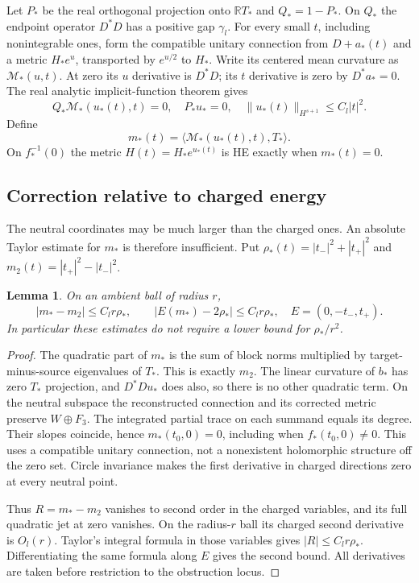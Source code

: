 \documentclass[11pt]{amsart}
\newtheorem{lemma}[theorem]{Lemma}
\theoremstyle{definition}
\theoremstyle{remark}
\newcommand{\RR}{\mathbb R}
\begin{document}
Let $P_*$ be the real orthogonal projection onto $\RR T_*$ and
$Q_*=1-P_*$. On $Q_*$ the endpoint operator $D^*D$ has a positive
gap $\gamma_l$. For every small $t$, including nonintegrable ones,
form the compatible unitary connection from $D+a_*(t)$ and a metric
$H_*e^u$, transported by $e^{u/2}$ to $H_*$. Write its centered mean
curvature as $\mathcal M_*(u,t)$. At zero its $u$ derivative is
$D^*D$; its $t$ derivative is zero by $D^*a_*=0$. The real analytic
implicit-function theorem gives
\begin{equation}\label{eq:endpoint-complement}
 Q_*\mathcal M_*(u_*(t),t)=0,\quad P_*u_*=0,\quad
 \|u_*(t)\|_{H^{s+1}}\le C_l|t|^2.
\end{equation}
Define
\[
 m_*(t)=\langle\mathcal M_*(u_*(t),t),T_*\rangle.
\]
On $f_*^{-1}(0)$ the metric $H(t)=H_*e^{u_*(t)}$ is HE exactly
when $m_*(t)=0$.

\subsection{Correction relative to charged energy}
The neutral coordinates may be much larger than the charged ones.
An absolute Taylor estimate for $m_*$ is therefore insufficient.
Put $\rho_*(t)=|t_-|^2+|t_+|^2$ and
$m_2(t)=|t_+|^2-|t_-|^2$.

\begin{lemma}\label{lem:charged-remainder}
On an ambient ball of radius $r$,
\begin{equation}\label{eq:charged-remainder}
 |m_*-m_2|\le C_l r\rho_*,\qquad
 |E(m_*)-2\rho_*|\le C_l r\rho_*,\quad
 E=(0,-t_-,t_+).
\end{equation}
In particular these estimates do not require a lower bound for
$\rho_*/r^2$.
\end{lemma}
\begin{proof}
The quadratic part of $m_*$ is the sum of block norms multiplied by
target-minus-source eigenvalues of $T_*$. This is exactly $m_2$.
The linear curvature of $b_*$ has zero $T_*$ projection, and
$D^*Du_*$ does also, so there is no other quadratic term.
On the neutral subspace the reconstructed connection and its corrected
metric preserve $W\oplus F_3$. The integrated partial trace on each
summand equals its degree. Their slopes coincide, hence $m_*(t_0,0)=0$,
including when $f_*(t_0,0)\ne0$. This uses a compatible unitary
connection, not a nonexistent holomorphic structure off the zero set.
Circle invariance makes the first derivative in charged directions
zero at every neutral point.

Thus $R=m_*-m_2$ vanishes to second order in the charged variables,
and its full quadratic jet at zero vanishes. On the radius-$r$ ball
its charged second derivative is $O_l(r)$. Taylor's integral formula
in those variables gives $|R|\le C_lr\rho_*$. Differentiating the
same formula along $E$ gives the second bound. All derivatives are
taken before restriction to the obstruction locus.
\end{proof}
\end{document}
